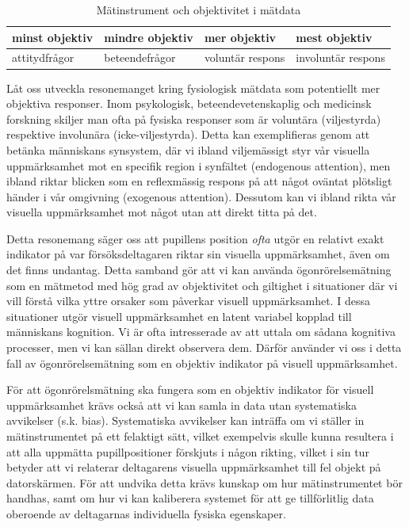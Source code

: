\documentclass[
]{book}
\begin{document}
\begin{table}

\caption{\label{tab:tab02-07-3}Mätinstrument och objektivitet i mätdata}
\centering
\begin{tabular}[t]{llll}
\toprule
minst objektiv & mindre objektiv & mer objektiv & mest objektiv\\
\midrule
attitydfrågor & beteendefrågor & voluntär respons & involuntär respons\\
\bottomrule
\end{tabular}
\end{table}

Låt oss utveckla resonemanget kring fysiologisk mätdata som potentiellt mer objektiva responser. Inom psykologisk, beteendevetenskaplig och medicinsk forskning skiljer man ofta på fysiska responser som är voluntära (viljestyrda) respektive involunära (icke-viljestyrda). Detta kan exemplifieras genom att betänka människans synsystem, där vi ibland viljemässigt styr vår visuella uppmärksamhet mot en specifik region i synfältet (endogenous attention), men ibland riktar blicken som en reflexmässig respons på att något oväntat plötsligt händer i vår omgivning (exogenous attention). Dessutom kan vi ibland rikta vår visuella uppmärksamhet mot något utan att direkt titta på det.

Detta resonemang säger oss att pupillens position \emph{ofta} utgör en relativt exakt indikator på var försöksdeltagaren riktar sin visuella uppmärksamhet, även om det finns undantag. Detta samband gör att vi kan använda ögonrörelsemätning som en mätmetod med hög grad av objektivitet och giltighet i situationer där vi vill förstå vilka yttre orsaker som påverkar visuell uppmärksamhet. I dessa situationer utgör visuell uppmärksamhet en latent variabel kopplad till människans kognition. Vi är ofta intresserade av att uttala om sådana kognitiva processer, men vi kan sällan direkt observera dem. Därför använder vi oss i detta fall av ögonrörelsemätning som en objektiv indikator på visuell uppmärksamhet.

För att ögonrörelsmätning ska fungera som en objektiv indikator för visuell uppmärksamhet krävs också att vi kan samla in data utan systematiska avvikelser (s.k. bias). Systematiska avvikelser kan inträffa om vi ställer in mätinstrumentet på ett felaktigt sätt, vilket exempelvis skulle kunna resultera i att alla uppmätta pupillpositioner förskjuts i någon rikting, vilket i sin tur betyder att vi relaterar deltagarens visuella uppmärksamhet till fel objekt på datorskärmen. För att undvika detta krävs kunskap om hur mätinstrumentet bör handhas, samt om hur vi kan kaliberera systemet för att ge tillförlitlig data oberoende av deltagarnas individuella fysiska egenskaper.
\end{document}

